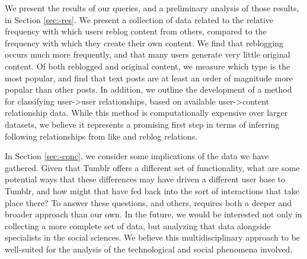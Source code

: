We present the results of our queries, and a preliminary analysis of 
those results, in Section \ref{sec:-res}.  We present a collection of 
data related to the relative frequency with which users reblog 
content from others, compared to the frequency with which they create 
their own content.  We find that reblogging occurs much more frequently, 
and that many users generate very little original content.  Of both 
reblogged and original content, we measure which type is the most 
popular, and find that text posts are at least an order of magnitude 
more popular than other posts.  In addition, we outline the development 
of a method for classifying user->user relationships, based on available 
user->content relationship data.  While this method is computationally 
expensive over larger datasets, we believe it represents a promising 
first step in terms of inferring following relationships from like 
and reblog relations.


In Section \ref{sec:-conc}, we consider some implications of the data 
we have gathered.  Given that Tumblr offers a different set of 
functionality, what are some potential ways that these differences may 
have driven a different user base to Tumblr, and how might that have 
fed back into the sort of interactions that take place there?  To 
answer these questions, and others, requires both a deeper and broader 
approach than our own.  In the future, we would be interested not only 
in collecting a more complete set of data, but analyzing that data 
alongside specialists in the social sciences.  We believe this 
multidisciplinary approach to be well-suited for the analysis of the 
technological and social phenomena involved.







